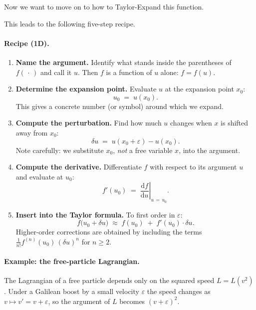 \documentclass{article}
\begin{document}
	Now we want to move on to how to Taylor-Expand this function.
	
	
	
	\noindent This leads to the following five-step recipe.
	
	\paragraph{Recipe (1D).}
	\begin{enumerate}
		\item \textbf{Name the argument.}
		Identify what stands inside the parentheses of $f(\,\cdot\,)$ and
		call it $u$.  Then $f$ is a function of $u$ alone: $f = f(u)$.
		
		\item \textbf{Determine the expansion point.}
		Evaluate $u$ at the expansion point $x_0$:
		\begin{equation}
			u_0 \;=\; u(x_0).
		\end{equation}
		This gives a concrete number (or symbol) around which we expand.
		
		\item \textbf{Compute the perturbation.}
		Find how much $u$ changes when $x$ is shifted away from $x_0$:
		\begin{equation}
			\delta u \;=\; u(x_0 + \varepsilon) - u(x_0).
		\end{equation}
		Note carefully: we substitute $x_0$, \emph{not} a free variable $x$,
		into the argument.
		
		\item \textbf{Compute the derivative.}
		Differentiate $f$ with respect to its argument $u$ and evaluate at
		$u_0$:
		\begin{equation}
			f'(u_0) \;=\; \left.\frac{\mathrm{d}f}{\mathrm{d}u}\right|_{u\,=\,u_0}.
		\end{equation}
		
		\item \textbf{Insert into the Taylor formula.}
		To first order in $\varepsilon$:
		\begin{equation}
			\boxed{f\bigl(u_0 + \delta u\bigr)
				\;\approx\; f(u_0) \;+\; f'(u_0)\cdot\delta u.}
			\label{eq:taylor1d}
		\end{equation}
		Higher-order corrections are obtained by including the terms
		$\tfrac{1}{n!}f^{(n)}(u_0)\,(\delta u)^n$ for $n \geq 2$.
	\end{enumerate}
	
	\paragraph{Example: the free-particle Lagrangian.}
	The Lagrangian of a free particle depends only on the squared speed
	$L = L(v^2)$.  Under a Galilean boost by a small velocity $\varepsilon$ the
	speed changes as $v \mapsto v' = v + \varepsilon$, so the argument of $L$
	becomes $(v+\varepsilon)^2$.
	
\end{document}
